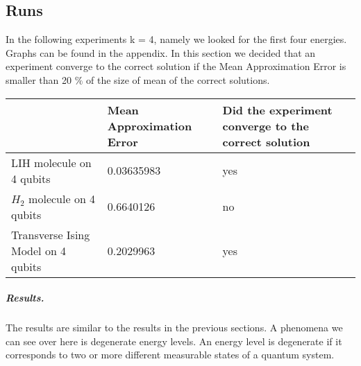 \documentclass[12pt, a4paper]{article}
\begin{document}
    \subsection{Runs}
    In the following experiments k = 4, namely we looked for the first four energies.
    Graphs can be found in the appendix.
    In this section we decided that an experiment converge to the correct solution if the Mean Approximation Error is smaller than 20 $\%$ of the size of mean of the correct solutions.

    \begin{tabular}{|p{3cm}|p{3cm}|p{3cm}|}
        \hline
        & Mean Approximation Error & Did the experiment converge to the correct solution   \\   \hline\hline
        LIH molecule on 4 qubits & 0.03635983 & yes \\  \hline
        $H_2$ molecule on 4 qubits & 0.6640126 & no \\  \hline
        Transverse Ising Model on 4 qubits & 0.2029963 & yes \\
        \hline
    \end{tabular}
    \subparagraph{Results.}
    \label{sec:for_all_ks_convergence}
    The results are similar to the results in the previous sections. A phenomena we can see over here is degenerate energy levels. An energy level is degenerate if it corresponds to two or more different measurable states of a quantum system.
\end{document}
